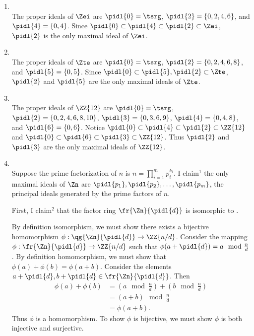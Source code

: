 \documentclass{article}
\begin{document}
\begin{solution} %
\begin{enumerate}[label=\tbo{\alph*.}]
  \item \Zei \\
    The proper ideals of \( \Zei \) are \( \pidl{0} = \tsrg \), \( \pidl{2} = \{0,2,4,6\}\), and \(\pidl{4} = \{0,4\}\).
    Since \( \pidl{0}\subset \pidl{4}\subset \pidl{2} \subset \Zei\), \( \pidl{2} \) is the only maximal ideal of \( \Zei \).
  \item \Zte \\
    The proper ideals of \( \Zte \) are \( \pidl{0} = \tsrg \), \( \pidl{2} = \{0,2,4,6,8\} \), and \( \pidl{5} = \{0,5\} \).
    Since \( \pidl{0}\subset \pidl{5}, \pidl{2} \subset \Zte \), \( \pidl{2} \) and \( \pidl{5} \) are the only maximal ideals of \( \Zte \).
  \item {} \\
    The proper ideals of \( \ZZ{12} \) are \( \pidl{0} = \tsrg \), \( \pidl{2} = \{0,2,4,6,8,10\} \), \( \pidl{3}=\{0,3,6,9\} \), \( \pidl{4}=\{0,4,8\} \), and \( \pidl{6}=\{0,6\} \).
    Notice \( \pidl{0}\subset\pidl{4} \subset \pidl{2} \subset \ZZ{12} \) and \( \pidl{0}\subset\pidl{6} \subset \pidl{3} \subset \ZZ{12} \). Thus \( \pidl{2} \) and \( \pidl{3} \) are the only maximal ideals of \( \ZZ{12} \).
  \item \Zn \\
    Suppose the prime factorization of \( n \) is \( n=\prod_{i=1}^{m} p_i^{k_i} \).
    I claim\( ^1 \) the only maximal ideals of \( \Zn \) are \( \pidl{p_1}, \pidl{p_2}, \ldots, \pidl{p_m} \), the principal ideals generated by the prime factors of \( n \).
    \begin{subproof}[Claim 1]
      First, I claim\( ^2 \) that the factor ring \( \fr{\Zn}{\pidl{d}} \) is isomorphic to .
      \begin{subproof}[Claim 2]
        By definition isomorphism, we must show there exists a bijective homomorphism \( \phi:\qg{\Zn}{\pidl{d}}\to \ZZ{n/d} \). Consider the mapping \( \phi:\fr{\Zn}{\pidl{d}}\to\ZZ{n/d} \) such that \(\phi(a+\pidl{d}) = a\mod{\frac{n}{d}} \).
        By definition homomorphism, we must show that \( \phi(a)+\phi(b) = \phi(a+b) \). Consider the elements \( a+\pidl{d}, b+\pidl{d}\in\fr{\Zn}{\pidl{d}} \). Then \begin{align*}
          \phi(a)+\phi(b) &= \left(a\mod{\frac{n}{d}}\right) + \left(b\mod{\frac{n}{d}}\right) \\
          &= (a+b)\mod{\frac{n}{d}} \\
          &= \phi(a+b).
        \end{align*}
        Thus \( \phi \) is a homomorphism. To show \( \phi \) is bijective, we must show \( \phi \) is both injective and surjective.


\end{subproof}
\end{subproof}
\end{enumerate}
\end{solution}
\end{document}
